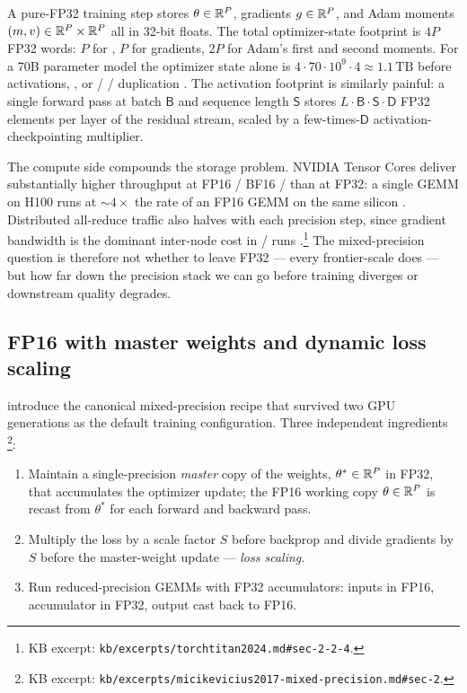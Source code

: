 A pure-FP32 training step stores  $\theta \in \mathbb{R}^P$,
gradients $g \in \mathbb{R}^P$, and Adam moments $(m, v) \in \mathbb{R}^P \times \mathbb{R}^P$
all in 32-bit floats. The total optimizer-state footprint is $4P$ FP32
words: $P$ for , $P$ for gradients, $2P$ for Adam's first and
second moments. For a $70$B parameter model the optimizer state alone is
$4 \cdot 70 \cdot 10^{9} \cdot 4 \approx 1.1\,\text{TB}$ before
activations, , or  /  /  duplication
\citep[\S 2]{kalamkar2019-bfloat16}. The activation footprint is
similarly painful: a single forward pass at batch $\mathsf{B}$ and
sequence length $\mathsf{S}$ stores $L \cdot \mathsf{B} \cdot
\mathsf{S} \cdot \mathsf{D}$ FP32 elements per layer of the residual
stream, scaled by a few-times-$\mathsf{D}$ activation-checkpointing
multiplier.

The compute side compounds the storage problem. NVIDIA Tensor Cores
deliver substantially higher throughput at FP16 / BF16 /  than at
FP32: a single  GEMM on H100 runs at $\sim 4\times$ the rate of an
FP16 GEMM on the same silicon \citep[\S 3.3]{deepseek-v3}. Distributed
all-reduce traffic also halves with each precision step, since
gradient bandwidth is the dominant inter-node cost in  /  runs
\citep[\S 2.2.4]{torchtitan2024}.\footnote{KB excerpt:
\nolinkurl{kb/excerpts/torchtitan2024.md#sec-2-2-4}.} The mixed-precision
question is therefore not whether to leave FP32 — every frontier-scale
 does — but how far down the precision stack we can go before
training diverges or downstream quality degrades.

\subsection{FP16 with master weights and dynamic loss scaling}
\label{sec:mp-fp16}

\citet{micikevicius2017-mixed-precision} introduce the canonical
mixed-precision recipe that survived two GPU generations as the default
training configuration. Three independent ingredients
\citep[\S 2--4]{micikevicius2017-mixed-precision}\footnote{KB excerpt:
\nolinkurl{kb/excerpts/micikevicius2017-mixed-precision.md#sec-2}.}:

\begin{enumerate}
\item Maintain a single-precision \emph{master} copy of the weights,
$\theta^* \in \mathbb{R}^P$ in FP32, that accumulates the optimizer update;
the FP16 working copy $\theta \in \mathbb{R}^P$ is recast from $\theta^*$ for
each forward and backward pass.
\item Multiply the loss by a scale factor $S$ before backprop and
divide gradients by $S$ before the master-weight update — \emph{loss
scaling}.
\item Run reduced-precision GEMMs with FP32 accumulators: inputs in
FP16, accumulator in FP32, output cast back to FP16.
\end{enumerate}

